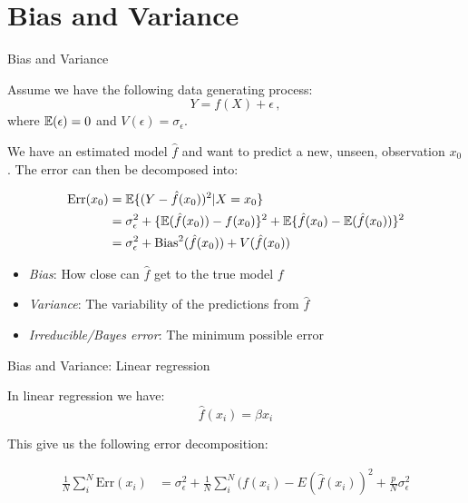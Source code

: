 \documentclass[10pt]{beamer}
\begin{document}



\section{Bias and Variance}
\frame{\sectionpage}

\begin{frame}{Bias and Variance}

Assume we have the following data generating process:
\[
Y = f(X) + \epsilon\,,
\]
where $\operatorname{\mathbb{E}}(\epsilon)=0$ and $V(\epsilon)=\sigma_\epsilon$.

We have an estimated model $\hat{f}$ and want to predict a new, unseen, observation $x_0$. The error can then be decomposed into:

\begin{align*}
\text{Err}(x_0) &= \operatorname{\mathbb{E}}\{(Y-\hat{f}(x_0))^2 | X = x_0\} \\
  &= \sigma^2_\epsilon + \{\operatorname{\mathbb{E}}(\hat{f}(x_0)) - f(x_0)\}^2 + \operatorname{\mathbb{E}}\{\hat{f}(x_0) - \operatorname{\mathbb{E}}(\hat{f}(x_0))\}^2 \\
  &= \sigma^2_\epsilon + \text{Bias}^2(\hat{f}(x_0)) + V(\hat{f}(x_0))
\end{align*}
\pause
\begin{itemize}
\item \emph{Bias}: How close can $\hat{f}$ get to the true model $f$
\item \emph{Variance}: The variability of the predictions from $\hat{f}$
\item \emph{Irreducible/Bayes error}: The minimum possible error
\end{itemize}

\end{frame}


\begin{frame}{Bias and Variance: Linear regression}

In linear regression we have:
\[
\hat{f}(x_i) = \hat{\beta} x_i
\]

This give us the following error decomposition:

\begin{align*}
\frac{1}{N}\sum^N_i \text{Err}(x_i) &= \sigma^2_\epsilon + \frac{1}{N}\sum^N_i (f(x_i) - E(\hat{f}(x_i))^2 + \frac{p}{N} \sigma^2_\epsilon
\end{align*}

\end{frame}
\end{document}
